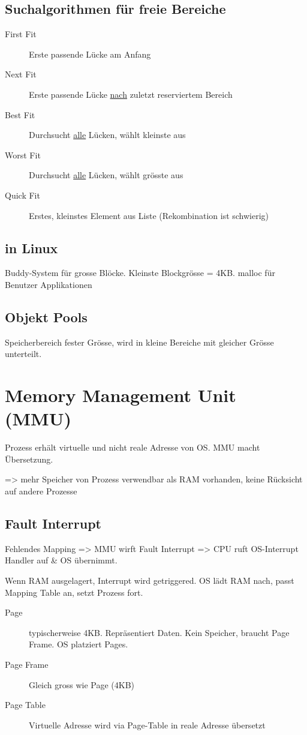 \begin{multicols*}{4}
\subsection{Suchalgorithmen für freie Bereiche}
\begin{description}
    \item[First Fit] Erste passende Lücke am Anfang
    \item[Next Fit] Erste passende Lücke \underline{nach} zuletzt reserviertem Bereich
    \item[Best Fit] Durchsucht \underline{alle} Lücken, wählt kleinste aus
    \item[Worst Fit] Durchsucht \underline{alle} Lücken, wählt grösste aus
    \item[Quick Fit] Erstes, kleinstes Element aus Liste
    (Rekombination ist schwierig)
\end{description}

\subsection{in Linux}
Buddy-System für grosse Blöcke. Kleinste Blockgrösse = 4KB. malloc für Benutzer Applikationen

\subsection{Objekt Pools}
Speicherbereich fester Grösse, wird in kleine Bereiche mit gleicher Grösse unterteilt.

\section{Memory Management Unit (MMU)}
Prozess erhält virtuelle und nicht reale Adresse von OS. MMU macht Übersetzung.

=> mehr Speicher von Prozess verwendbar als RAM vorhanden, keine Rücksicht auf andere Prozesse

\subsection{Fault Interrupt}
Fehlendes Mapping => MMU wirft Fault Interrupt => CPU ruft OS-Interrupt Handler auf \& OS übernimmt.\vspace{2pt}

Wenn RAM ausgelagert, Interrupt wird getriggered. OS lädt RAM nach, passt Mapping Table an, setzt Prozess fort.

\begin{description}
    \item[Page] typischerweise 4KB. Repräsentiert Daten. Kein Speicher, braucht Page Frame. OS platziert Pages.
    \item[Page Frame] Gleich gross wie Page (4KB)
    \item[Page Table] Virtuelle Adresse wird via Page-Table in reale Adresse übersetzt
\end{description}


\end{multicols*}
